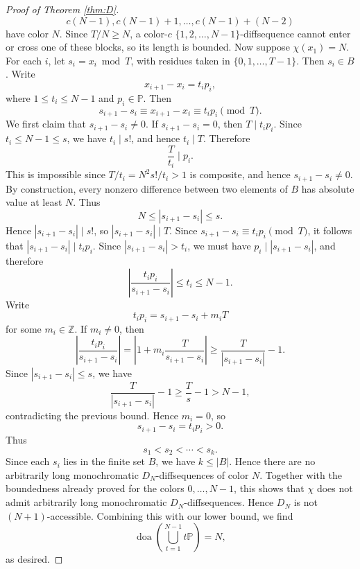 \documentclass[10pt,a4paper]{amsart}
\begin{document}
\begin{proof}[Proof of Theorem \ref{thm:D}]
$$c(N-1),c(N-1)+1,\dots,c(N-1)+(N-2)$$ have color $N$. Since $T/N \geq N$, a color-$c$ $\{1,2,\dots,N-1\}$-diffsequence cannot enter or cross one of these blocks, so its length is bounded. Now suppose $\chi(x_1)=N$. For each $i$, let $s_i=x_i\bmod T$, with residues taken in $\{0,1,\dots,T-1\}$. Then $s_i\in B$. Write $$x_{i+1}-x_i=t_ip_i,$$ where $1\leq t_i\leq N-1$ and $p_i\in\mathbb P$. Then $$s_{i+1}-s_{i}\equiv x_{i+1}-x_i\equiv t_ip_i\pmod T.$$ We first claim that $s_{i+1}-s_{i}\neq 0$. If $s_{i+1}-s_{i}=0$, then $T\mid t_ip_i$. Since $t_i\leq N-1\leq s$, we have $t_i\mid s!$, and hence $t_i\mid T$. Therefore $$\frac{T}{t_i}\mid p_i.$$ This is impossible since $T/t_i=N^2s!/t_i>1$ is composite, and hence $s_{i+1}-s_{i}\neq 0$. By construction, every nonzero difference between two elements of $B$ has absolute value at least $N$. Thus $$N\leq |s_{i+1}-s_{i}|\leq s.$$ Hence $|s_{i+1}-s_{i}|\mid s!$, so $|s_{i+1}-s_{i}|\mid T$. Since $s_{i+1}-s_i\equiv t_ip_i\pmod T$, it follows that $|s_{i+1}-s_i|\mid t_ip_i$. Since $|s_{i+1}-s_i|>t_i$, we must have $p_i\mid |s_{i+1}-s_i|$, and therefore $$\left|\frac{t_ip_i}{s_{i+1}-s_{i}}\right|\leq t_i\leq N-1.$$ Write $$t_ip_i=s_{i+1}-s_{i}+m_iT$$ for some $m_i\in\mathbb Z$. If $m_i\neq 0$, then $$ \left|\frac{t_ip_i}{s_{i+1}-s_{i}}\right| = \left|1+m_i\frac{T}{s_{i+1}-s_{i}}\right| \geq \frac{T}{|s_{i+1}-s_{i}|}-1. $$ Since $|s_{i+1}-s_{i}|\leq s$, we have $$ \frac{T}{|s_{i+1}-s_{i}|}-1\geq \frac{T}{s}-1>N-1, $$ contradicting the previous bound. Hence $m_i=0$, so $$s_{i+1}-s_{i}=t_ip_i>0.$$ Thus $$s_1<s_2<\cdots<s_k.$$ Since each $s_i$ lies in the finite set $B$, we have $k\leq |B|$. Hence there are no arbitrarily long monochromatic $D_N$-diffsequences of color $N$. Together with the boundedness already proved for the colors $0,\dots,N-1$, this shows that $\chi$ does not admit arbitrarily long monochromatic $D_N$-diffsequences. Hence $D_N$ is not $(N+1)$-accessible. Combining this with our lower bound, we find $$\operatorname{doa}\left(\bigcup_{t=1}^{N-1}t\mathbb{P}\right)=N,$$ as desired. \end{proof}
\end{document}
